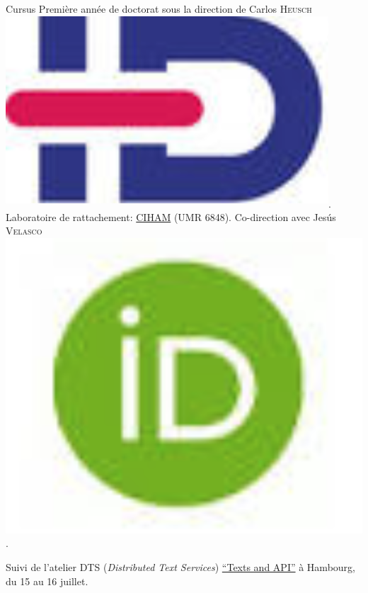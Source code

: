 \begin{rubric}{Cursus}
                                \entry*[2018-2019]
                            Première année de doctorat sous la direction de Carlos \textsc{Heusch}\href{https://www.idref.fr/055838413}{\textsuperscript{\includegraphics[scale=0.025]{img/idref.png}}}. Laboratoire de rattachement: \href{http://ciham.ish-lyon.cnrs.fr/}{CIHAM} (UMR 6848). Co-direction
                        avec Jesús \textsc{
                        Velasco}\href{https://orcid.org/0000-0002-3848-9230}{\includegraphics[scale=0.025]{img/orcid.png}}.
                    
                                \entry*
                            Suivi de l'atelier DTS (\textit{Distributed Text Services}) \href{https://distributed-text-services.github.io/workshops/events/2019-hamburg/}{\enquote{Texts and API}} à Hambourg, du 15 au 16
                        juillet.
                    

\end{rubric}

